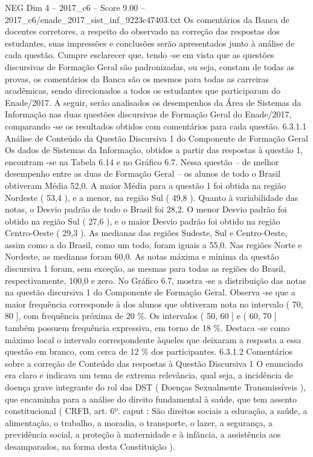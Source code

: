\begin{textsample}{NEG Dim 4 – 2017\_c6 – Score 9.00 – 2017\_c6/enade\_2017\_sist\_inf\_9223c47403.txt}
Os comentários da Banca de docentes corretores, a respeito do observado na correção das respostas dos estudantes, suas impressões e conclusões serão apresentados junto à análise de cada questão.
Cumpre esclarecer que, tendo -se em vista que as questões discursivas de Formação Geral são padronizadas, ou seja, constam de todas as provas, os comentários da Banca são os mesmos para todas as carreiras acadêmicas, sendo direcionados a todos os estudantes que participaram do Enade/2017.
A seguir, serão analisados os desempenhos da Área de Sistemas da Informação nas duas questões discursivas de Formação Geral do Enade/2017, comparando -se os resultados obtidos com comentários para cada questão. 6.3.1.1 Análise de Conteúdo da Questão Discursiva 1 do Componente de Formação Geral Os dados de Sistemas da Informação, obtidos a partir das respostas à questão 1, encontram -se na Tabela 6.14 e no Gráfico 6.7.
Nessa questão – de melhor desempenho entre as duas de Formação Geral – os alunos de todo o Brasil obtiveram Média 52,0.
A maior Média para a questão 1 foi obtida na região Nordeste ( 53,4 ), e a menor, na região Sul ( 49,8 ).
Quanto à variabilidade das notas, o Desvio padrão de todo o Brasil foi 28,2.
O menor Desvio padrão foi obtido na região Sul ( 27,6 ), e o maior Desvio padrão foi obtido na região Centro-Oeste ( 29,3 ).
As medianas das regiões Sudeste, Sul e Centro-Oeste, assim como a do Brasil, como um todo, foram iguais a 55,0.
Nas regiões Norte e Nordeste, as medianas foram 60,0.
As notas máxima e mínima da questão discursiva 1 foram, sem exceção, as mesmas para todas as regiões do Brasil, respectivamente, 100,0 e zero.
No Gráfico 6.7, mostra -se a distribuição das notas na questão discursiva 1 do Componente de Formação Geral.
Observa -se que a maior frequência corresponde à dos alunos que obtiveram nota no intervalo ( 70, 80 ], com frequência próxima de 20 \%.
Os intervalos ( 50, 60 ] e ( 60, 70 ] também possuem frequência expressiva, em torno de 18 \%.
Destaca -se como máximo local o intervalo correspondente àqueles que deixaram a resposta a essa questão em branco, com cerca de 12 \% dos participantes. 6.3.1.2 Comentários sobre a correção de Conteúdo das respostas à Questão Discursiva 1 O enunciado era claro e indicava um tema de extrema relevância, qual seja, a incidência de doença grave integrante do rol das DST ( Doenças Sexualmente Transmissíveis ), que encaminha para a análise do direito fundamental à saúde, que tem assento constitucional ( CRFB, art. 6º. caput : São direitos sociais a educação, a saúde, a alimentação, o trabalho, a moradia, o transporte, o lazer, a segurança, a previdência social, a proteção à maternidade e à infância, a assistência aos desamparados, na forma desta Constituição ).

\end{textsample}
